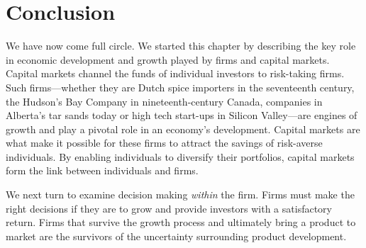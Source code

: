 \section*{Conclusion}

We have now come full circle. We started this chapter by describing the key
role in economic development and growth played by firms and capital markets.
Capital markets channel the funds of individual investors to risk-taking
firms. Such firms---whether they are Dutch spice importers in the
seventeenth century, the Hudson's Bay Company in nineteenth-century Canada,
companies in Alberta's tar sands today or high tech start-ups in Silicon
Valley---are engines of growth and play a pivotal role in an economy's
development. Capital markets are what make it possible for these firms to
attract the savings of risk-averse individuals. By enabling individuals to
diversify their portfolios, capital markets form the link between
individuals and firms.

We next turn to examine decision making \textit{within} the firm. Firms must
make the right decisions if they are to grow and provide investors with a
satisfactory return. Firms that survive the growth process and ultimately
bring a product to market are the survivors of the uncertainty surrounding
product development.
